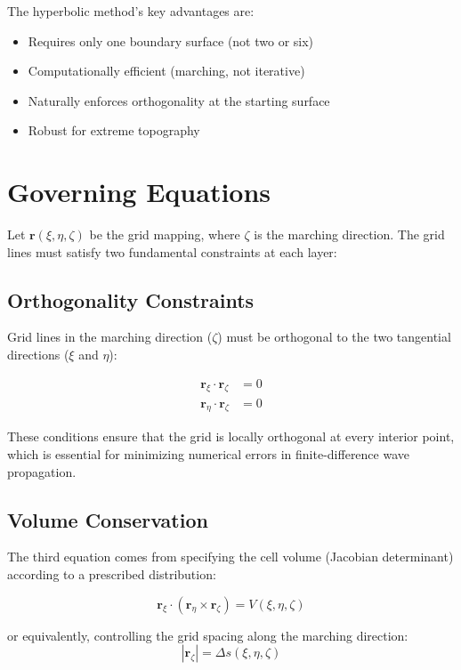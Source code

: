 \documentclass[11pt,a4paper]{report}
\newcommand{\rvec}{\bm{r}}
\begin{document}
The hyperbolic method's key advantages are:
\begin{itemize}
    \item Requires only one boundary surface (not two or six)
    \item Computationally efficient (marching, not iterative)
    \item Naturally enforces orthogonality at the starting surface
    \item Robust for extreme topography
\end{itemize}

\section{Governing Equations}

Let $\rvec(\xi, \eta, \zeta)$ be the grid mapping, where $\zeta$ is the marching direction. The grid lines must satisfy two fundamental constraints at each layer:

\subsection{Orthogonality Constraints}

Grid lines in the marching direction ($\zeta$) must be orthogonal to the two tangential directions ($\xi$ and $\eta$):

\begin{align}
    \rvec_\xi \cdot \rvec_\zeta &= 0 \label{eq:ortho_xi} \\
    \rvec_\eta \cdot \rvec_\zeta &= 0 \label{eq:ortho_eta}
\end{align}

These conditions ensure that the grid is locally orthogonal at every interior point, which is essential for minimizing numerical errors in finite-difference wave propagation.

\subsection{Volume Conservation}

The third equation comes from specifying the cell volume (Jacobian determinant) according to a prescribed distribution:

\begin{equation}
    \rvec_\xi \cdot (\rvec_\eta \times \rvec_\zeta) = V(\xi, \eta, \zeta)
\end{equation}

or equivalently, controlling the grid spacing along the marching direction:
\begin{equation}
    |\rvec_\zeta| = \Delta s(\xi, \eta, \zeta)
\end{equation}
\end{document}
